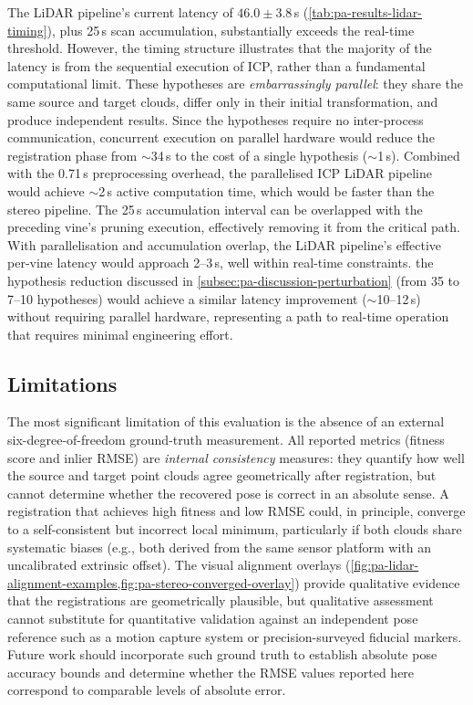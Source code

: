The LiDAR pipeline's current latency of $46.0 \pm 3.8$\,s (\cref{tab:pa-results-lidar-timing}), plus 25\,s scan accumulation, substantially exceeds the real-time threshold. However, the timing structure illustrates that the majority of the latency is from the sequential execution of ICP, rather than a fundamental computational limit. These hypotheses are \emph{embarrassingly parallel}: they share the same source and target clouds, differ only in their initial transformation, and produce independent results. Since the hypotheses require no inter-process communication, concurrent execution on parallel hardware would reduce the registration phase from $\sim$34\,s to the cost of a single hypothesis ($\sim$1\,s). Combined with the 0.71\,s preprocessing overhead, the parallelised ICP LiDAR pipeline would achieve $\sim$2\,s active computation time, which would be faster than the stereo pipeline. The 25\,s accumulation interval can be overlapped with the preceding vine's pruning execution, effectively removing it from the critical path. With parallelisation and accumulation overlap, the LiDAR pipeline's effective per-vine latency would approach 2--3\,s, well within real-time constraints. the hypothesis reduction discussed in \cref{subsec:pa-discussion-perturbation} (from 35 to 7--10 hypotheses) would achieve a similar latency improvement ($\sim$10--12\,s) without requiring parallel hardware, representing a path to real-time operation that requires minimal engineering effort.

\subsection{Limitations}
\label{subsec:pa-discussion-limitations}

The most significant limitation of this evaluation is the absence of an external six-degree-of-freedom ground-truth measurement. All reported metrics (fitness score and inlier RMSE) are \emph{internal consistency} measures: they quantify how well the source and target point clouds agree geometrically after registration, but cannot determine whether the recovered pose is correct in an absolute sense. A registration that achieves high fitness and low RMSE could, in principle, converge to a self-consistent but incorrect local minimum, particularly if both clouds share systematic biases (e.g., both derived from the same sensor platform with an uncalibrated extrinsic offset). The visual alignment overlays (\cref{fig:pa-lidar-alignment-examples,fig:pa-stereo-converged-overlay}) provide qualitative evidence that the registrations are geometrically plausible, but qualitative assessment cannot substitute for quantitative validation against an independent pose reference such as a motion capture system or precision-surveyed fiducial markers. Future work should incorporate such ground truth to establish absolute pose accuracy bounds and determine whether the RMSE values reported here correspond to comparable levels of absolute error.

